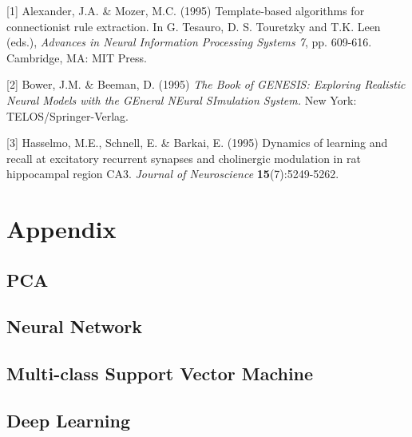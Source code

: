 \documentclass{article} %
\begin{document}
\small{
[1] Alexander, J.A. \& Mozer, M.C. (1995) Template-based algorithms
for connectionist rule extraction. In G. Tesauro, D. S. Touretzky
and T.K. Leen (eds.), {\it Advances in Neural Information Processing
Systems 7}, pp. 609-616. Cambridge, MA: MIT Press.

[2] Bower, J.M. \& Beeman, D. (1995) {\it The Book of GENESIS: Exploring
Realistic Neural Models with the GEneral NEural SImulation System.}
New York: TELOS/Springer-Verlag.

[3] Hasselmo, M.E., Schnell, E. \& Barkai, E. (1995) Dynamics of learning
and recall at excitatory recurrent synapses and cholinergic modulation
in rat hippocampal region CA3. {\it Journal of Neuroscience}
{\bf 15}(7):5249-5262.
}

\newpage
\section{Appendix}
\subsection{PCA}
\subsection{Neural Network}
\subsection{Multi-class Support Vector Machine}
\subsection{Deep Learning}
\end{document}
